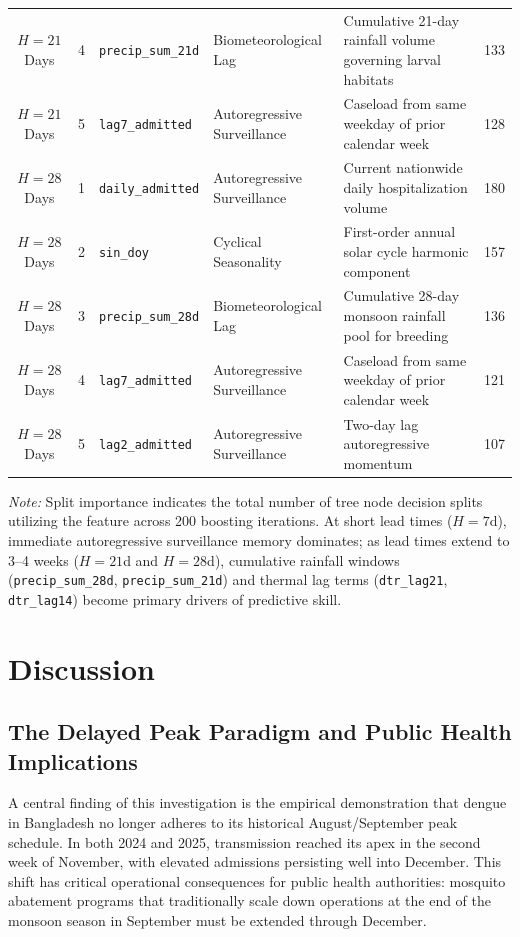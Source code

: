 \documentclass[11pt,a4paper]{article}
\begin{document}
\begin{table}[t]
\begin{tabular*}{\textwidth}{@{\extracolsep{\fill}}cclllc@{}}
$H=21$ Days & 4 & \texttt{precip\_sum\_21d} & Biometeorological Lag & Cumulative 21-day rainfall volume governing larval habitats & 133 \\
$H=21$ Days & 5 & \texttt{lag7\_admitted} & Autoregressive Surveillance & Caseload from same weekday of prior calendar week & 128 \\
\midrule
$H=28$ Days & 1 & \texttt{daily\_admitted} & Autoregressive Surveillance & Current nationwide daily hospitalization volume & 180 \\
$H=28$ Days & 2 & \texttt{sin\_doy} & Cyclical Seasonality & First-order annual solar cycle harmonic component & 157 \\
$H=28$ Days & 3 & \texttt{precip\_sum\_28d} & Biometeorological Lag & Cumulative 28-day monsoon rainfall pool for breeding & 136 \\
$H=28$ Days & 4 & \texttt{lag7\_admitted} & Autoregressive Surveillance & Caseload from same weekday of prior calendar week & 121 \\
$H=28$ Days & 5 & \texttt{lag2\_admitted} & Autoregressive Surveillance & Two-day lag autoregressive momentum & 107 \\
\bottomrule
\end{tabular*}
\begin{flushleft}
\footnotesize{\textit{Note:} Split importance indicates the total number of tree node decision splits utilizing the feature across 200 boosting iterations. At short lead times ($H=7$d), immediate autoregressive surveillance memory dominates; as lead times extend to 3--4 weeks ($H=21$d and $H=28$d), cumulative rainfall windows (\texttt{precip\_sum\_28d}, \texttt{precip\_sum\_21d}) and thermal lag terms (\texttt{dtr\_lag21}, \texttt{dtr\_lag14}) become primary drivers of predictive skill.}
\end{flushleft}
\end{table}


\section{Discussion}

\subsection{The Delayed Peak Paradigm and Public Health Implications}
A central finding of this investigation is the empirical demonstration that dengue in Bangladesh no longer adheres to its historical August/September peak schedule. In both 2024 and 2025, transmission reached its apex in the second week of November, with elevated admissions persisting well into December. This shift has critical operational consequences for public health authorities: mosquito abatement programs that traditionally scale down operations at the end of the monsoon season in September must be extended through December.
\end{document}
